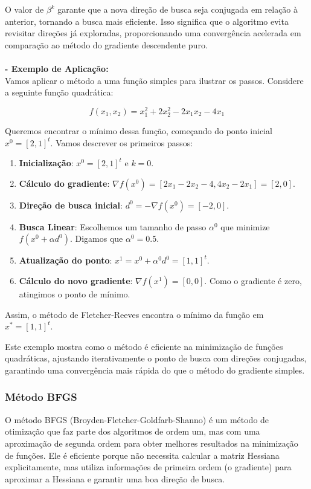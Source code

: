 \documentclass[a4paper, 12pt]{article}
\begin{document}
O valor de $\beta^k$ garante que a nova direção de busca seja conjugada em relação à anterior, tornando a busca mais eficiente. Isso significa que o algoritmo evita revisitar direções já exploradas, proporcionando uma convergência acelerada em comparação ao método do gradiente descendente puro.\\\\

\textbf{- Exemplo de Aplicação:}\\

Vamos aplicar o método a uma função simples para ilustrar os passos. Considere a seguinte função quadrática:

\[
f(x_1, x_2) = x_1^2 + 2x_2^2 - 2x_1x_2 - 4x_1
\]

Queremos encontrar o mínimo dessa função, começando do ponto inicial $x^0 = [2, 1]^t$. Vamos descrever os primeiros passos:

\begin{enumerate}
    \item \textbf{Inicialização}: $x^0 = [2, 1]^t$ e $k = 0$.
    \item \textbf{Cálculo do gradiente}: $\nabla f(x^0) = [2x_1 - 2x_2 - 4, 4x_2 - 2x_1] = [2, 0]$.
    \item \textbf{Direção de busca inicial}: $d^0 = -\nabla f(x^0) = [-2, 0]$.
    \item \textbf{Busca Linear}: Escolhemos um tamanho de passo $\alpha^0$ que minimize $f(x^0 + \alpha d^0)$. Digamos que $\alpha^0 = 0.5$.
    \item \textbf{Atualização do ponto}: $x^1 = x^0 + \alpha^0 d^0 = [1, 1]^t$.
    \item \textbf{Cálculo do novo gradiente}: $\nabla f(x^1) = [0, 0]$. Como o gradiente é zero, atingimos o ponto de mínimo.
\end{enumerate}

Assim, o método de Fletcher-Reeves encontra o mínimo da função em $x^* = [1, 1]^t$.

Este exemplo mostra como o método é eficiente na minimização de funções quadráticas, ajustando iterativamente o ponto de busca com direções conjugadas, garantindo uma convergência mais rápida do que o método do gradiente simples.


\subsubsection{Método BFGS}

O método BFGS (Broyden-Fletcher-Goldfarb-Shanno) é um método de otimização que faz parte dos algoritmos de ordem um, mas com uma aproximação de segunda ordem para obter melhores resultados na minimização de funções. Ele é eficiente porque não necessita calcular a matriz Hessiana explicitamente, mas utiliza informações de primeira ordem (o gradiente) para aproximar a Hessiana e garantir uma boa direção de busca.
\end{document}
